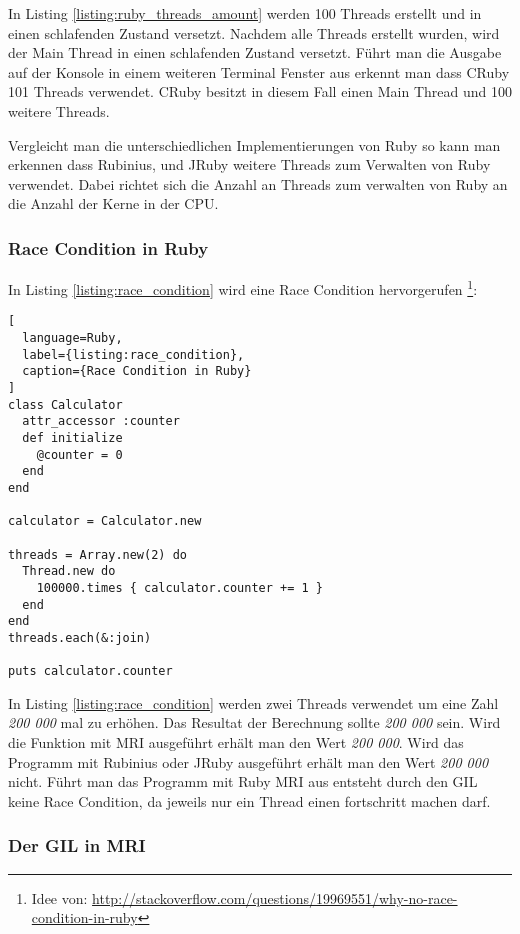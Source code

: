 In Listing \ref{listing:ruby_threads_amount} werden 100 Threads erstellt und in einen schlafenden Zustand versetzt. Nachdem alle Threads erstellt wurden, wird der Main Thread in einen schlafenden Zustand versetzt. Führt man die Ausgabe auf der Konsole in einem weiteren Terminal Fenster aus erkennt man dass CRuby 101 Threads verwendet. CRuby besitzt in diesem Fall einen Main Thread und 100 weitere Threads.

Vergleicht man die unterschiedlichen Implementierungen von Ruby so kann man erkennen dass Rubinius, und JRuby weitere Threads zum Verwalten von Ruby verwendet. Dabei richtet sich die Anzahl an Threads zum verwalten von Ruby an die Anzahl der Kerne in der CPU.

\subsubsection{Race Condition in Ruby}

In Listing \ref{listing:race_condition} wird eine Race Condition hervorgerufen \footnote{Idee von: \url{http://stackoverflow.com/questions/19969551/why-no-race-condition-in-ruby}}: 

\begin{lstlisting}[
  language=Ruby,
  label={listing:race_condition},
  caption={Race Condition in Ruby}
]
class Calculator
  attr_accessor :counter
  def initialize
    @counter = 0
  end
end

calculator = Calculator.new

threads = Array.new(2) do
  Thread.new do
    100000.times { calculator.counter += 1 }
  end
end
threads.each(&:join)

puts calculator.counter

\end{lstlisting}

In Listing \ref{listing:race_condition} werden zwei Threads verwendet um eine Zahl \emph{200 000} mal zu erhöhen. Das Resultat der Berechnung sollte \emph{200 000} sein. Wird die Funktion mit MRI ausgeführt erhält man den Wert \emph{200 000}. Wird das Programm mit Rubinius oder JRuby ausgeführt erhält man den Wert \emph{200 000} nicht. Führt man das Programm mit Ruby MRI aus entsteht durch den GIL keine Race Condition, da jeweils nur ein Thread einen fortschritt machen darf.

\subsubsection{Der GIL in MRI}

